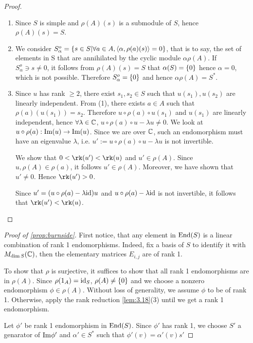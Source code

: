 \documentclass[twoside = false,	%
		headsepline,		%
		parskip = true,
		]{scrbook}						%
\begin{document}
    \begin{proof}
    \begin{enumerate}
        \item Since $S$ is simple and $\rho(A)(s)$ is a submodule of $S$, hence $\rho(A)(s)=S$.
        \item We consider $S^o_\alpha = \left\{  s\in S | \forall a \in A, \left\langle \alpha, \rho(a)(s)\right\rangle = 0\right\}$, that is to say, the set of elements in S that are annihilated by the cyclic module $\alpha \rho(A)$. If $S_\alpha^o\ni s \neq 0$, it follows from $\rho(A)(s)=S$ that $\alpha(S)=\left\{ 0\right\}$ hence $\alpha = 0$, which is not possible. Therefore $S_\alpha^o = \left\{ 0\right\}$ and hence $\alpha \rho(A) = S^*$.
        \item Since $u$ has rank $\geq 2$, there exist $s_1, s_2 \in S$ such that $u(s_1), u(s_2)$ are linearly independent. From (1), there exists $a\in A$ such that $\rho(a)(u(s_1))=s_2$. Therefore $u \circ \rho(a) \circ u(s_1)$ and $u(s_1)$ are linearly independent, hence $\forall \lambda \in \mathbb C$, $u\circ\rho(a)\circ u - \lambda u\neq 0$. We look at $u \circ \rho(a): \mathrm{Im}(u) \to \mathrm{Im} (u)$. Since we are over $\mathbb C$, such an endomorphism must have an eigenvalue $\lambda$, i.e. $u':= u\circ \rho(a)\circ u -\lambda u$ is not invertible.
        
        We show that $0<\rk(u') < \rk(u)$ and $u'\in \rho(A)$.
        Since $u, \rho(A)\in \rho(a)$, it follows $u'\in \rho(A)$. Moreover, we have shown that $u'\neq 0$. Hence $\rk(u')> 0$.
        
        Since $u'=(u\circ \rho(a)-\lambda\mathrm{id})u$ and $u\circ \rho(a) - \lambda \mathrm{id}$ is not invertible, it follows that $\rk(u')< \rk(u)$.
    \end{enumerate}
    \end{proof}
    

    \begin{proof}[Proof of \ref{prop:burnside}]
        First notice, that any element in $\mathrm{End}(S)$ is a linear combination of rank 1 endomorphisms. Indeed, fix a basis of $S$ to identify it with $M_{\dim S}(\mathbb C)$, then the elementary matrices $E_{i,j}$ are of rank 1.

        To show that $\rho$ is surjective, it suffices to show that all rank 1 endomorphisms are in $\rho(A)$.
        Since $\rho(1_A)=\mathrm{id}_S$, $\rho(A)\neq\left\{ 0\right\}$ and we choose a nonzero endomorphism $\phi\in\rho(A)$. Without loss of generality, we assume $\phi$ to be of rank 1. Otherwise, apply the rank reduction \ref{lem:3.18}(3) until we get a rank 1 endomorphism.

        Let $\phi'$ be rank 1 endomorphism in $\mathrm{End}(S)$. Since $\phi'$ has rank 1, we choose $S'$ a genarator of $\mathrm{Im} \phi'$ and $\alpha'\in S^*$ such that $\phi'(v) = \alpha'(v)s'$ 
        
    \end{proof}
\end{document}
